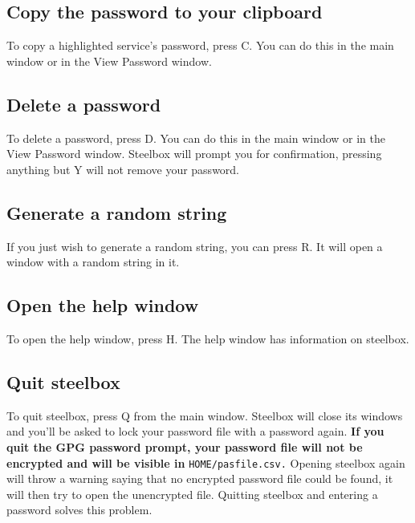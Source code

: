 \documentclass{article}
\begin{document}
  \subsection{Copy the password to your clipboard}
  To copy a highlighted service's password, press C. You can do this in the main window or in the View Password window.

  \subsection{Delete a password}
  To delete a password, press D. You can do this in the main window or in the View Password window. Steelbox will prompt you for
  confirmation, pressing anything but Y will not remove your password.

  \subsection{Generate a random string}
  If you just wish to generate a random string, you can press R. It will open a window with a random string in it.

  \subsection{Open the help window}
  To open the help window, press H. The help window has information on steelbox.

  \subsection{Quit steelbox}
  To quit steelbox, press Q from the main window. Steelbox will close its windows and you'll be asked to lock your password file with a password again.
  \textbf{If you quit the GPG password prompt, your password file will not be encrypted and will be visible in} \texttt{\textdollar HOME/pasfile.csv.}
  Opening steelbox again will throw a warning saying that no encrypted password file could be found, it will then try to open the unencrypted file.
  Quitting steelbox and entering a password solves this problem.
\end{document}
